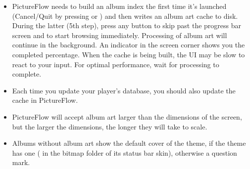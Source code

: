   \begin{itemize}
    \item PictureFlow needs to build an album index the first time it's launched
    (Cancel/Quit by pressing \ActionStdCancel{} or \ActionStdMenu{}) and then writes an album art cache to disk.
    During the latter (5th step), press any button to skip past the progress bar screen and
    to start browsing immediately. Processing of album art will continue in the
    background. An indicator in the screen corner shows you the completed percentage.
    When the cache is being built, the UI may be slow to react to your input.
    For optimal performance, wait for processing to complete.
    \item Each time you update your player's database, you should also update the cache
    in PictureFlow.
    \item PictureFlow will accept album art larger than the dimensions of the
    screen, but the larger the dimensions, the longer they will take to scale.
    \item Albums without album art show the default cover of the theme, if
    the theme has one ( in the bitmap folder of its
    status bar skin), otherwise a question mark.
  \end{itemize}

